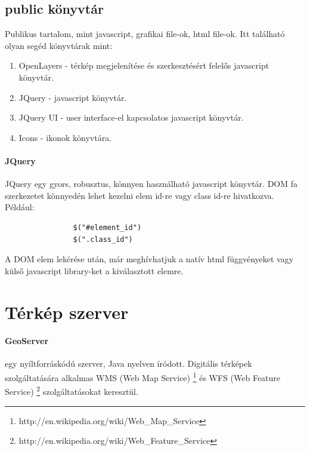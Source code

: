 	\subsection{public könyvtár}
	\label{sub:public_könyvtár}
	Publikus tartalom, mint javascript, grafikai file-ok, html file-ok.
	Itt található olyan segéd könyvtárak mint:
	\begin{enumerate}
	 \item OpenLayers - térkép megjelenítése és szerkesztésért felelős javascript könyvtár.
	 \item JQuery - javascript könyvtár.
	 \item JQuery UI - user interface-el kapcsolatos javascript könyvtár.
	 \item Icons - ikonok könyvtára.
	\end{enumerate}
	
	\paragraph{JQuery} %
	JQuery egy gyors, robusztus, könnyen használható javascript könyvtár. DOM fa szerkezetet könnyedén lehet kezelni elem id-re vagy class id-re hivatkozva.
	Például:
	\begin{verbatim}
		        $("#element_id")
		        $(".class_id")
	\end{verbatim}
	A DOM elem lekérése után, már meghívhatjuk a natív html függvényeket vagy külső javascript library-ket a kiválasztott elemre.




  

\section{Térkép szerver} %
\label{sec:térkép_szerver}
\paragraph{GeoServer} egy nyíltforráskódú szerver, Java nyelven íródott. Digitális térképek szolgáltatására alkalmas 
WMS (Web Map Service) \footnote{http://en.wikipedia.org/wiki/Web\_Map\_Service} és WFS (Web Feature Service) \footnote{http://en.wikipedia.org/wiki/Web\_Feature\_Service} szolgáltatásokat keresztül.

